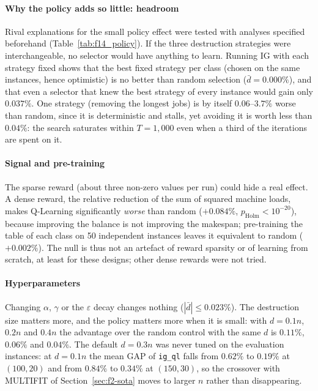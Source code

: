 \documentclass[final,3p,times,11pt,authoryear]{elsarticle}
\begin{document}


\paragraph{Why the policy adds so little: headroom}
Rival explanations for the small policy effect were tested with analyses
specified beforehand (Table~\ref{tab:f14_policy}). If the three destruction
strategies were interchangeable, no selector would have anything to learn.
Running IG with each strategy fixed shows that the best fixed strategy per
class (chosen on the same instances, hence optimistic) is no better than
random selection ($\bar d = 0.000\%$), and that even a selector that knew the
best strategy of every instance would gain only $0.037\%$. One strategy
(removing the longest jobs) is by itself $0.06$--$3.7\%$ worse than random,
since it is deterministic and stalls, yet avoiding it is worth less than
$0.04\%$: the search saturates within $T=1{,}000$ even when a third of the
iterations are spent on it.

\paragraph{Signal and pre-training}
The sparse reward (about three non-zero values per run) could hide a real
effect. A dense reward, the relative reduction of the sum of squared machine
loads, makes Q-Learning significantly \emph{worse} than random ($+0.084\%$,
$p_{\mathrm{Holm}}<10^{-20}$), because improving the balance is not improving
the makespan; pre-training the table of each class on 50 independent
instances leaves it equivalent to random ($+0.002\%$). The null is thus not
an artefact of reward sparsity or of learning from scratch, at least for these
designs; other dense rewards were not tried.

\paragraph{Hyperparameters}
Changing $\alpha$, $\gamma$ or the $\varepsilon$ decay changes nothing
($|\bar d| \leq 0.023\%$). The destruction size matters more, and the policy
matters more when it is small: with $d=0.1n$, $0.2n$ and $0.4n$ the advantage
over the random control with the same $d$ is $0.11\%$, $0.06\%$ and $0.04\%$.
The default $d=0.3n$ was never tuned on the evaluation instances: at $d=0.1n$
the mean GAP of \texttt{ig\_ql} falls from $0.62\%$ to $0.19\%$ at $(100,20)$
and from $0.84\%$ to $0.34\%$ at $(150,30)$, so the crossover with MULTIFIT of
Section~\ref{sec:f2-sota} moves to larger $n$ rather than disappearing.
\end{document}
